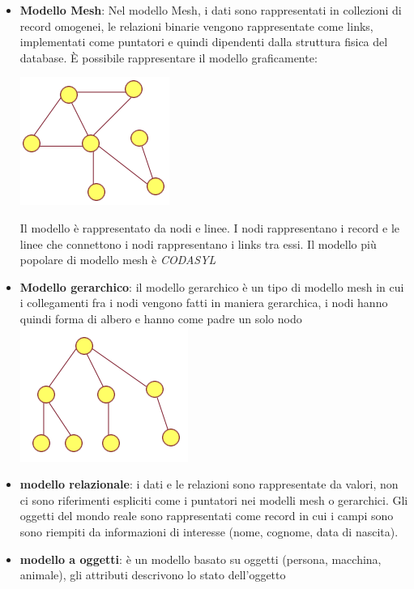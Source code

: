 \documentclass{article}
\begin{document}
        \begin{itemize}

            \item \textbf{Modello Mesh}:
            Nel modello Mesh, i dati sono rappresentati in collezioni di record omogenei, le relazioni binarie vengono rappresentate come links, implementati come puntatori e quindi dipendenti dalla struttura fisica del database. È possibile rappresentare il modello graficamente:
            
            \includegraphics[]{immagini/modello Mesh.png}

            Il modello è rappresentato da nodi e linee. I nodi rappresentano i record e le linee che connettono i nodi rappresentano i links tra essi. Il modello più popolare di modello mesh è \textit{CODASYL}

            \item \textbf{Modello gerarchico}:
            il modello gerarchico è un tipo di modello mesh in cui i collegamenti fra i nodi vengono fatti in maniera gerarchica, i nodi hanno quindi forma di albero e hanno come padre un solo nodo
            \includegraphics[]{immagini/modello gerarchico.png}

            \item \textbf{modello relazionale}:
            i dati e le relazioni sono rappresentate da valori, non ci sono riferimenti espliciti come i puntatori nei modelli mesh o gerarchici. Gli oggetti del mondo reale sono rappresentati come record in cui i campi sono sono riempiti da informazioni di interesse (nome, cognome, data di nascita).

            \item \textbf{modello a oggetti}:
            è un modello basato su oggetti (persona, macchina, animale), gli attributi descrivono lo stato dell'oggetto
        \end{itemize}
\end{document}
